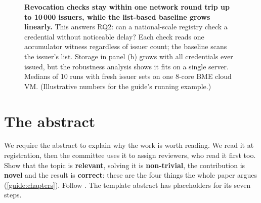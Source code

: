 \begin{figure}[!ht]
  \centering
  \caption{\textbf{Revocation checks stay within one network round trip up to 10\,000 issuers, while the list-based baseline grows linearly.} This answers RQ2: can a national-scale registry check a credential without noticeable delay? Each check reads one accumulator witness regardless of issuer count; the baseline scans the issuer's list. Storage in panel (b) grows with all credentials ever issued, but the robustness analysis shows it fits on a single server. Medians of 10 runs with fresh issuer sets on one 8-core BME cloud VM. (Illustrative numbers for the guide's running example.)}\label{guide:fig:caption-example}
\end{figure}

\section{The abstract}\label{guide:writing:abstract}
We require the abstract to explain why the work is worth reading. We read it at registration, then the committee uses it to assign reviewers, who read it first too. Show that the topic is \textbf{relevant}, solving it is \textbf{non-trivial}, the contribution is \textbf{novel} and the result is \textbf{correct}: these are the four things the whole paper argues (\cref{guide:chapters}). Follow . The template abstract has placeholders for its seven steps.

